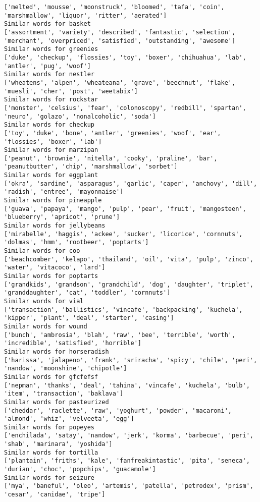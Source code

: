 \documentclass[11pt]{article}
\begin{document}
\begin{Verbatim}[commandchars=\\\{\}]
['melted', 'mousse', 'moonstruck', 'bloomed', 'tafa', 'coin', 'marshmallow', 'liquor', 'ritter', 'aerated']
Similar words for basket
['assortment', 'variety', 'described', 'fantastic', 'selection', 'merchant', 'overpriced', 'satisfied', 'outstanding', 'awesome']
Similar words for greenies
['duke', 'checkup', 'flossies', 'toy', 'boxer', 'chihuahua', 'lab', 'antler', 'pug', 'woof']
Similar words for nestler
['wheatens', 'alpen', 'wheateana', 'grave', 'beechnut', 'flake', 'muesli', 'cher', 'post', 'weetabix']
Similar words for rockstar
['monster', 'celsius', 'fear', 'colonoscopy', 'redbill', 'spartan', 'neuro', 'golazo', 'nonalcoholic', 'soda']
Similar words for checkup
['toy', 'duke', 'bone', 'antler', 'greenies', 'woof', 'ear', 'flossies', 'boxer', 'lab']
Similar words for marzipan
['peanut', 'brownie', 'nitella', 'cooky', 'praline', 'bar', 'peanutbutter', 'chip', 'marshmallow', 'sorbet']
Similar words for eggplant
['okra', 'sardine', 'asparagus', 'garlic', 'caper', 'anchovy', 'dill', 'radish', 'entree', 'mayonnaise']
Similar words for pineapple
['guava', 'papaya', 'mango', 'pulp', 'pear', 'fruit', 'mangosteen', 'blueberry', 'apricot', 'prune']
Similar words for jellybeans
['mirabelle', 'haggis', 'ackee', 'sucker', 'licorice', 'cornnuts', 'dolmas', 'hmm', 'rootbeer', 'poptarts']
Similar words for coo
['beachcomber', 'kelapo', 'thailand', 'oil', 'vita', 'pulp', 'zinco', 'water', 'vitacoco', 'lard']
Similar words for poptarts
['grandkids', 'grandson', 'grandchild', 'dog', 'daughter', 'triplet', 'granddaughter', 'cat', 'toddler', 'cornnuts']
Similar words for vial
['transaction', 'ballistics', 'vincafe', 'backpacking', 'kuchela', 'kipper', 'plant', 'deal', 'starter', 'casing']
Similar words for wound
['bunch', 'ambrosia', 'blah', 'raw', 'bee', 'terrible', 'worth', 'incredible', 'satisfied', 'horrible']
Similar words for horseradish
['harissa', 'jalapeno', 'frank', 'sriracha', 'spicy', 'chile', 'peri', 'nandow', 'moonshine', 'chipotle']
Similar words for gfcfefsf
['nepman', 'thanks', 'deal', 'tahina', 'vincafe', 'kuchela', 'bulb', 'item', 'transaction', 'baklava']
Similar words for pasteurized
['cheddar', 'raclette', 'raw', 'yoghurt', 'powder', 'macaroni', 'almond', 'whiz', 'velveeta', 'egg']
Similar words for popeyes
['enchilada', 'satay', 'nandow', 'jerk', 'korma', 'barbecue', 'peri', 'shab', 'marinara', 'yoshida']
Similar words for tortilla
['plantain', 'friths', 'kale', 'fanfreakintastic', 'pita', 'seneca', 'durian', 'choc', 'popchips', 'guacamole']
Similar words for seizure
['mya', 'baneful', 'oleo', 'artemis', 'patella', 'petrodex', 'prism', 'cesar', 'canidae', 'tripe']

\end{Verbatim}
\end{document}
